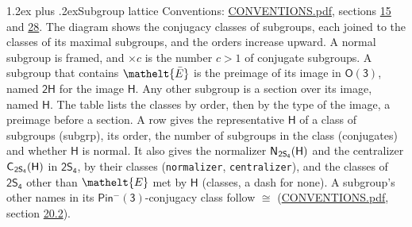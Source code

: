 \documentclass[10pt,a4paper]{article}
\makeatletter
\renewcommand\section{\@startsection{section}{1}{\z@}{-3ex plus -1ex minus -.2ex}%
  {1.2ex plus .2ex}{\normalfont\large\sffamily\bfseries\color{parttitle}}}
\numberwithin{equation}{section}
\newcommand{\eltfont}[1]{{\let\sigma\eltsigma\mathelt{#1}}}
\newcommand{\grp}[1]{\mathsf{#1}}
\newcommand{\cls}[1]{\eltfont{#1}}
\newcommand{\elt}[1]{\eltfont{#1}}
\newcommand{\samecls}{\cong}
\newcommand{\barred}[1]{\bar{#1}}
\newcommand{\hairsp}{\mkern1mu}
\makeatother
\begin{document}
\section{Subgroup lattice}\label{s:subgroups}
Conventions: \href{../../CONVENTIONS.pdf}{CONVENTIONS.pdf}, sections \href{../../../rotation/CONVENTIONS.pdf\#conv.15}{15} and \href{../../CONVENTIONS.pdf\#conv.28}{28}.
The diagram shows the conjugacy classes of subgroups, each joined to the classes of its maximal subgroups, and the orders increase upward. \label{n:index.conjugates.c}A normal subgroup is framed, and ${\times}c$ is the number $c > 1$ of conjugate subgroups. \label{n:group.H}A subgroup that contains $\elt{\barred{E}}$ is the preimage of its image in $\grp{O(3)}$, named $\grp{2H}$ for the image $\grp{H}$. Any other subgroup is a section over its image, named $\grp{H}$. The table lists the classes by order, then by the type of the image, a preimage before a section. \label{n:head.subgroup}\label{n:head.order}\label{n:head.conjugates}\label{n:head.normal}A row gives the representative $\grp{H}$ of a class of subgroups (subgrp), its order, the number of subgroups in the class (conjugates) and whether $\grp{H}$ is normal. \label{n:group.normalizer}\label{n:group.centralizer}\label{n:head.classes}It also gives the normalizer $\grp{N}_{\hairsp \grp{2S_{4}}}(\grp{H})$ and the centralizer $\grp{C}_{\hairsp \grp{2S_{4}}}(\grp{H})$ in $\grp{2S_{4}}$, by their classes (\texttt{normalizer}, \texttt{centralizer}), and the classes of $\grp{2S_{4}}$ other than $\cls{E}$ met by $\grp{H}$ (classes, a dash for none). A subgroup's other names in its \href{Pinminus3.pdf}{$\grp{Pin^{-}(3)}$}-conjugacy class follow $\samecls$ (\href{../../CONVENTIONS.pdf}{CONVENTIONS.pdf}, section \href{../../CONVENTIONS.pdf\#conv.20.2}{20.2}).
\begin{center}
\end{center}
\end{document}

